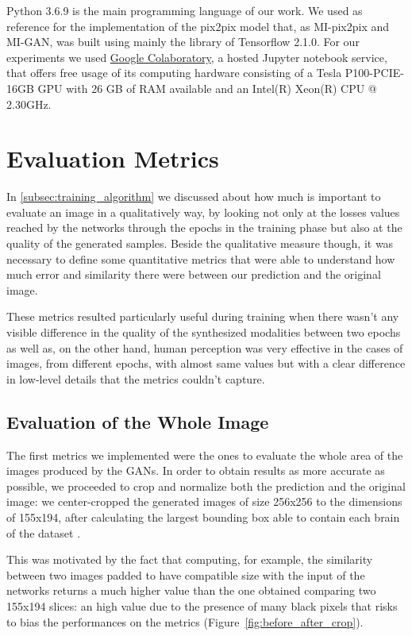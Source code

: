 Python 3.6.9 is the main programming language of our work. We used \cite{pix2pix_implementation} as reference for the implementation of the pix2pix model that, as MI-pix2pix and MI-GAN, was built using mainly the library of Tensorflow 2.1.0. For our experiments we used \href{https://colab.research.google.com}{Google Colaboratory}, a hosted Jupyter notebook service, that offers free usage of its computing hardware consisting of a Tesla P100-PCIE-16GB GPU with 26 GB of RAM available and an Intel(R) Xeon(R) CPU @ 2.30GHz.
\newpage
\section{Evaluation Metrics}
\label{sec:evaluation_metrics}
In \autoref{subsec:training_algorithm} we discussed about how much is important to evaluate an image in a qualitatively way, by looking not only at the losses values reached by the networks through the epochs in the training phase but also at the quality of the generated samples. 
Beside the qualitative measure though, it was necessary to define some quantitative metrics that were able to understand how much error and similarity there were between our prediction and the original image. 

\vspace{5mm} %
These metrics resulted particularly useful during training when there wasn't any visible difference in the quality of the synthesized modalities between two epochs as well as, on the other hand, human perception was very effective in the cases of images, from different epochs, with almost same values but with a clear difference in low-level details that the metrics couldn't capture.

\subsection{Evaluation of the Whole Image}
\label{subsec:eval_overall_area}
The first metrics we implemented were the ones to evaluate the whole area of the images produced by the \ac{GAN}s. In order to obtain results as more accurate as possible, we proceeded to crop and normalize both the prediction and the original image: we center-cropped the generated images of size 256x256 to the dimensions of 155x194, after calculating the largest bounding box able to contain each brain of the dataset \cite{migan}. 

This was motivated by the fact that computing, for example, the similarity between two images padded to have compatible size with the input of the networks returns a much higher value than the one obtained comparing two 155x194 slices: an high value due to the presence of many black pixels that risks to bias the performances on the metrics (Figure~\ref{fig:before_after_crop}).

